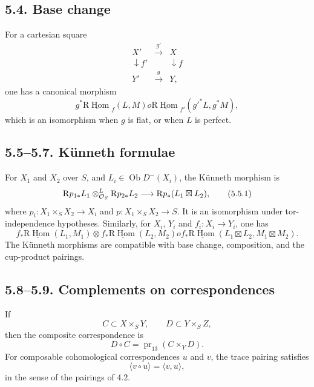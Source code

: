 \documentclass[11pt]{article}
\theoremstyle{plain}
\theoremstyle{definition}
\theoremstyle{remark}
\DeclareMathOperator{\Hom}{Hom}
\DeclareMathOperator{\ob}{Ob}
\DeclareMathOperator{\pr}{pr}
\newcommand{\R}{\mathrm R}
\begin{document}
\subsection*{5.4. Base change}
For a cartesian square
\[
\begin{array}{ccc}
X' & \xrightarrow{g'} & X \\
\downarrow f' & & \downarrow f \\
Y' & \xrightarrow{g} & Y,
\end{array}
\]
one has a canonical morphism
\begin{equation}
   g^*\underline{\R\Hom}_f(L,M)	o
   \underline{\R\Hom}_{f'}(g'^*L,g^*M),
   \tag{5.4.1}
\end{equation}
which is an isomorphism when $g$ is flat, or when $L$ is perfect.

\subsection*{5.5--5.7. Künneth formulae}
For $X_1$ and $X_2$ over $S$, and $L_i\in\ob D^{-}(X_i)$, the Künneth morphism is
\begin{equation}
   \R p_{1*}L_1\otimes^L_{\cO_S}\R p_{2*}L_2
      \longrightarrow \R p_*(L_1\boxtimes L_2),
   \tag{5.5.1}
\end{equation}
where $p_i:X_1\times_S X_2\to X_i$ and $p:X_1\times_S X_2\to S$. It is an isomorphism under tor-independence hypotheses. Similarly, for $X_i$, $Y_i$ and $f_i:X_i\to Y_i$, one has
\begin{equation}
   f_*\underline{\R\Hom}(L_1,M_1)\otimes
   f_*\underline{\R\Hom}(L_2,M_2)	o
   f_*\underline{\R\Hom}(L_1\boxtimes L_2,M_1\boxtimes M_2).
   \tag{5.6.1}
\end{equation}
The Künneth morphisms are compatible with base change, composition, and the cup-product pairings.

\subsection*{5.8--5.9. Complements on correspondences}
If
\[
   C\subset X\times_S Y,
   \qquad
   D\subset Y\times_S Z,
\]
then the composite correspondence is
\[
   D\circ C=\pr_{13}(C\times_YD).
\]
For composable cohomological correspondences $u$ and $v$, the trace pairing satisfies
\begin{equation}
   \langle v\circ u\rangle=\langle v,u\rangle,
   \tag{5.9.1}
\end{equation}
in the sense of the pairings of 4.2.
\end{document}
